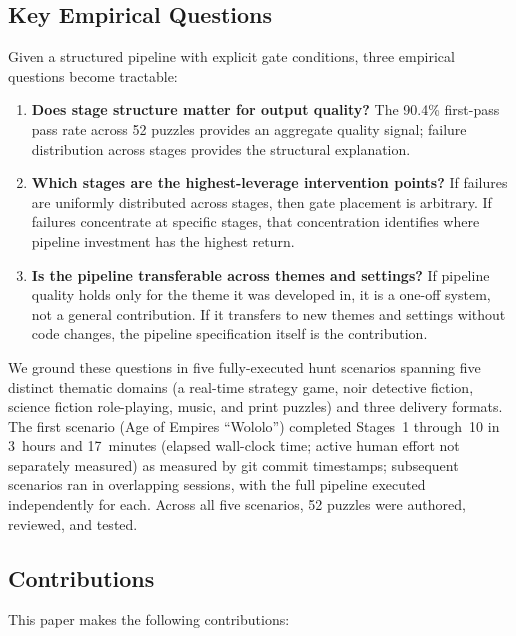 \subsection*{Key Empirical Questions}

Given a structured pipeline with explicit gate conditions, three empirical questions become
tractable:

\begin{enumerate}
  \item \textbf{Does stage structure matter for output quality?} The 90.4\% first-pass pass
  rate across 52 puzzles provides an aggregate quality signal; failure distribution across
  stages provides the structural explanation.

  \item \textbf{Which stages are the highest-leverage intervention points?} If failures are
  uniformly distributed across stages, then gate placement is arbitrary. If failures
  concentrate at specific stages, that concentration identifies where pipeline investment has
  the highest return.

  \item \textbf{Is the pipeline transferable across themes and settings?} If pipeline quality holds only for
  the theme it was developed in, it is a one-off system, not a general contribution. If it
  transfers to new themes and settings without code changes, the pipeline specification itself is the
  contribution.
\end{enumerate}

We ground these questions in five fully-executed hunt scenarios spanning five distinct
thematic domains (a real-time strategy game, noir detective fiction, science fiction
role-playing, music, and print puzzles) and three delivery formats. The first scenario (Age
of Empires ``Wololo'') completed Stages~1 through~10 in 3~hours and 17~minutes (elapsed
wall-clock time; active human effort not separately measured) as measured by git commit
timestamps; subsequent scenarios ran in overlapping sessions, with the full
pipeline executed independently for each. Across all five scenarios, 52 puzzles were
authored, reviewed, and tested.

\subsection*{Contributions}

This paper makes the following contributions:

